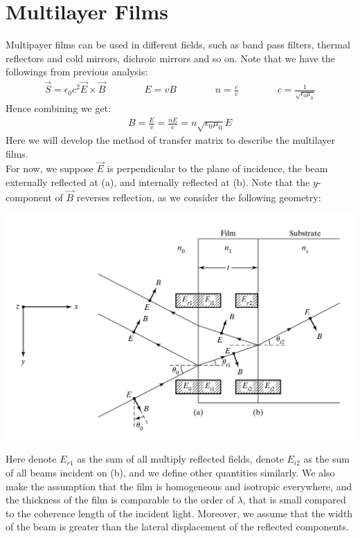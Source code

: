 \documentclass[11pt]{book}
\theoremstyle{break}
\theoremstyle{break}
\begin{document}
\newpage
\chapter{Multilayer Films}
Multipayer films can be used in different fields, such as band pass filters, thermal reflectors and cold mirrors, dichroic mirrors and so on. Note that we have the followings from previous analysis:
\begin{align*}
\vec{S} = \epsilon_0 c^2 \vec{E}\times \vec{B}\qquad\qquad E = vB\qquad\qquad n = \frac{c}{v}\qquad\qquad c = \frac{1}{\sqrt{\epsilon_0 \mu_0}}
\end{align*}
Hence combining we get:
\begin{align*}
B = \frac{E}{v} = \frac{nE}{c} = n\sqrt{\epsilon_0 \mu_0 }E
\end{align*}
Here we will develop the method of transfer matrix to describe the multilayer films. \\

For now, we suppose $\vec{E}$ is perpendicular to the plane of incidence, the beam externally reflected at (a), and internally reflected at (b). Note that the $y$-component of $\vec{B}$ reverses reflection, as we consider the following geometry:
\begin{center}
\includegraphics[scale=0.55]{multilayer}
\end{center}
Here denote $E_{r1}$ as the sum of all multiply reflected fields, denote $E_{i2}$ as the sum of all beams incident on (b), and we define other quantities similarly. We also make the assumption that the film is homogeneous and isotropic everywhere, and the thickness of the film is comparable to the order of $\lambda$, that is small compared to the coherence length of the incident light. Moreover, we assume that the width of the beam is greater than the lateral displacement of the reflected components.  \\
\end{document}
